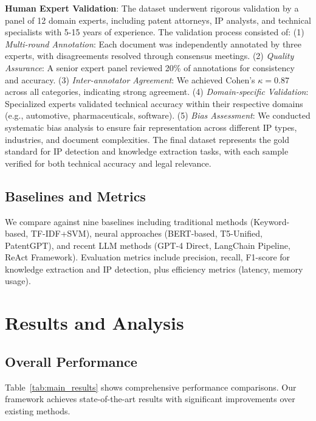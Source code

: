 \documentclass[11pt,a4paper]{article}
\begin{document}
\textbf{Human Expert Validation}: The dataset underwent rigorous validation by a panel of 12 domain experts, including patent attorneys, IP analysts, and technical specialists with 5-15 years of experience. The validation process consisted of: (1) \textit{Multi-round Annotation}: Each document was independently annotated by three experts, with disagreements resolved through consensus meetings. (2) \textit{Quality Assurance}: A senior expert panel reviewed 20\% of annotations for consistency and accuracy. (3) \textit{Inter-annotator Agreement}: We achieved Cohen's $\kappa = 0.87$ across all categories, indicating strong agreement. (4) \textit{Domain-specific Validation}: Specialized experts validated technical accuracy within their respective domains (e.g., automotive, pharmaceuticals, software). (5) \textit{Bias Assessment}: We conducted systematic bias analysis to ensure fair representation across different IP types, industries, and document complexities. The final dataset represents the gold standard for IP detection and knowledge extraction tasks, with each sample verified for both technical accuracy and legal relevance.

\subsection{Baselines and Metrics}

We compare against nine baselines including traditional methods (Keyword-based, TF-IDF+SVM), neural approaches (BERT-based, T5-Unified, PatentGPT), and recent LLM methods (GPT-4 Direct, LangChain Pipeline, ReAct Framework). Evaluation metrics include precision, recall, F1-score for knowledge extraction and IP detection, plus efficiency metrics (latency, memory usage).

\section{Results and Analysis}

\subsection{Overall Performance}

Table~\ref{tab:main_results} shows comprehensive performance comparisons. Our framework achieves state-of-the-art results with significant improvements over existing methods.
\end{document}
